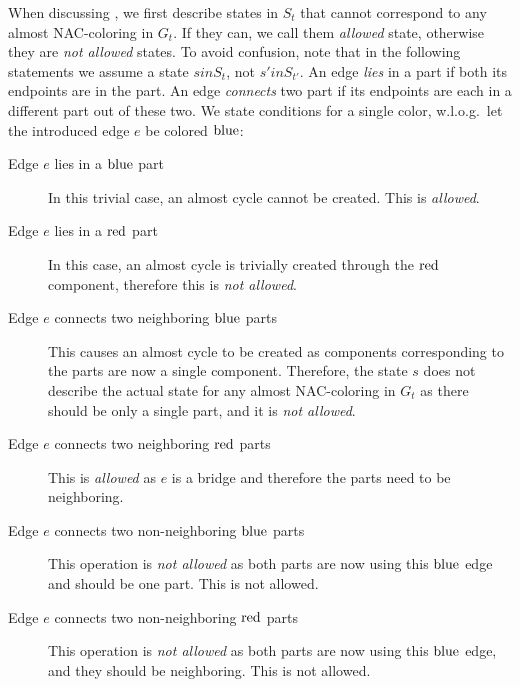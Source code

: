 When discussing \IntroduceEdgeNode{}, we first describe states in \( S_{t} \)
that cannot correspond to any almost NAC-coloring in \( G_t \).
If they can, we call them \emph{allowed} state, otherwise they are \emph{not allowed} states.
To avoid confusion, note that in the following statements we assume
a state \( s in S_t \), not \( s' in S_{t'} \).
An edge \emph{lies} in a part if both its endpoints are in the part.
An edge \emph{connects} two part if its endpoints are each in a different part out of these two.
We state conditions for a single color,
w.l.o.g.\ let the introduced edge \( e \) be colored \( \text{blue} \):
%
\begin{description}
	\item[Edge \( e \) lies in a \( \text{blue} \) part]
	      In this trivial case, an almost cycle cannot be created.
	      This is \emph{allowed}.
	\item[Edge \( e \) lies in a \( \text{red} \) part]
	      In this case, an almost cycle is trivially created
	      through the \( \text{red} \) component,
	      therefore this is \emph{not allowed}.
	\item[Edge \( e \) connects two neighboring \( \text{blue} \) parts]
	      This causes an almost cycle to be created as
	      components corresponding to the parts
	      are now a single component.
	      Therefore, the state \( s \) does not describe
	      the actual state for any almost NAC-coloring in \( G_t \)
	      as there should be only a single part, and it is \emph{not allowed}.
	\item[Edge \( e \) connects two neighboring \( \text{red} \) parts]
	      This is \emph{allowed} as \( e \) is a bridge and therefore the parts need to be neighboring.
	\item[Edge \( e \) connects two non-neighboring \( \text{blue} \) parts]
	      This operation is \emph{not allowed} as both parts
	      are now using this \( \text{blue} \) edge and should be one part.
	      This is not allowed.
	\item[Edge \( e \) connects two non-neighboring \( \text{red} \) parts]
	      This operation is \emph{not allowed} as both parts
	      are now using this \( \text{blue} \) edge,
	      and they should be neighboring.
	      This is not allowed.
\end{description}
%
%

